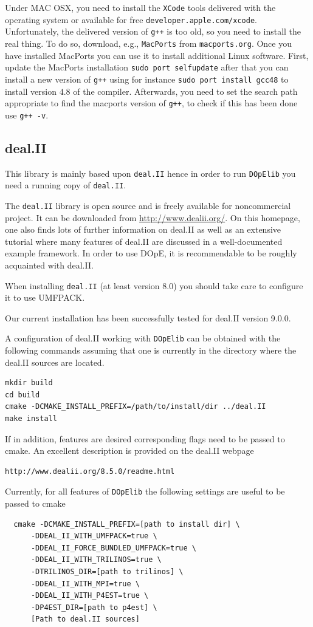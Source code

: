 Under MAC OSX, you need to install the \texttt{XCode} tools delivered with the operating system 
or available for free \texttt{developer.apple.com/xcode}. Unfortunately, the delivered 
version of \texttt{g++} is too old, so you need to install the real thing. To do so, 
download, e.g., \texttt{MacPorts} from \texttt{macports.org}. Once you have installed MacPorts 
you can use it to install additional Linux software. 
First, update the MacPorts installation \texttt{sudo port selfupdate}
after that you can install a new version of \texttt{g++} using for instance 
\texttt{sudo port install gcc48} to install version $4.8$ of the compiler.
Afterwards, you need to set the search path appropriate to find the macports version
of \texttt{g++}, to check if this has been done use \texttt{g++ -v}.

\subsection{deal.II}
This library is mainly based upon \texttt{deal.II} hence in order to run 
\texttt{DOpElib} you need a running copy of \texttt{deal.II}.

The \texttt{deal.II} library is open source and is freely available for noncommercial project.
It can be downloaded from \url{http://www.dealii.org/}. On this
homepage, one also finds lots of further information on deal.II as well as
an extensive tutorial where many features of deal.II are discussed in a
well-documented example framework. In order to use DOpE, it is
recommendable to be roughly acquainted with deal.II.

When installing \texttt{deal.II} (at least version 8.0) you should take care to configure 
it to use UMFPACK.

\begin{remark}
Our current \dope{} installation has been successfully tested for deal.II version 9.0.0.
\end{remark}

A configuration of deal.II working with \texttt{DOpElib} can be obtained with
the following commands assuming that one is currently in the 
directory where the deal.II sources are located.
\begin{lstlisting}
mkdir build
cd build 
cmake -DCMAKE_INSTALL_PREFIX=/path/to/install/dir ../deal.II
make install
\end{lstlisting}
If in addition, features are desired corresponding flags need to be passed to
cmake. An excellent description is provided on the deal.II webpage
\begin{lstlisting}
http://www.dealii.org/8.5.0/readme.html
\end{lstlisting}
Currently, for all features of \texttt{DOpElib} the following settings
are useful to be passed to cmake
\begin{lstlisting}
  cmake -DCMAKE_INSTALL_PREFIX=[path to install dir] \ 
      -DDEAL_II_WITH_UMFPACK=true \
      -DDEAL_II_FORCE_BUNDLED_UMFPACK=true \
      -DDEAL_II_WITH_TRILINOS=true \
      -DTRILINOS_DIR=[path to trilinos] \
      -DDEAL_II_WITH_MPI=true \
      -DDEAL_II_WITH_P4EST=true \
      -DP4EST_DIR=[path to p4est] \
      [Path to deal.II sources]
\end{lstlisting}

